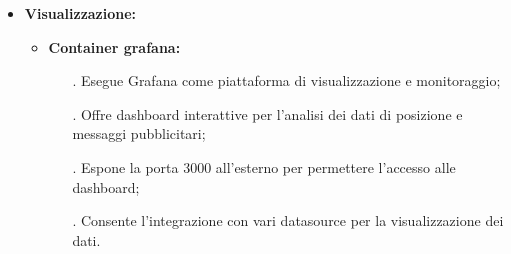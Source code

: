 \documentclass[10pt]{article}
\begin{document}
\begin{itemize}
    \item \textbf{Visualizzazione:}
    \begin{itemize}
        \item \textbf{Container grafana:}
        \begin{itemize}
            \item[.] Esegue Grafana come piattaforma di visualizzazione e monitoraggio;
            \item[.] Offre dashboard interattive per l'analisi dei dati di posizione e messaggi pubblicitari;
            \item[.] Espone la porta 3000 all'esterno per permettere l'accesso alle dashboard;
            \item[.] Consente l'integrazione con vari datasource per la visualizzazione dei dati.
        \end{itemize}
    \end{itemize}
\end{itemize}
\end{document}
